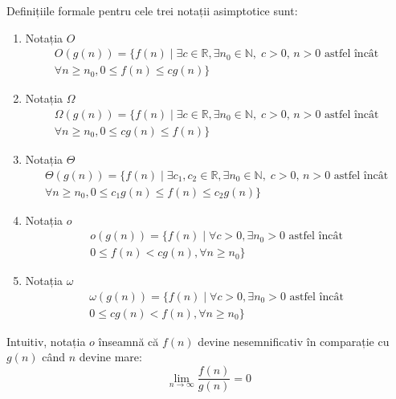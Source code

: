 \documentclass{article}
\begin{document}
Definițiile formale pentru cele trei notații asimptotice sunt:
\begin{enumerate}
	\item Notația $O$
	      \begin{multline}
		      O(g(n)) = \{ f(n) \mid \exists c \in \mathbb{R},
		      \exists n_0 \in \mathbb{N},\; c > 0,\, n > 0 \text{ astfel încât } \\
		      \forall n \geq n_0, 0 \le f(n) \leq c g(n) \}
	      \end{multline}

	\item Notația $\Omega$
	      \begin{multline}
		      \Omega(g(n)) = \{ f(n) \mid \exists c \in \mathbb{R},
		      \exists n_0 \in \mathbb{N},\; c > 0,\, n > 0 \text{ astfel încât } \\
		      \forall n \geq n_0, 0 \le c g(n) \leq f(n) \}
	      \end{multline}

	\item Notația $\Theta$
	      \begin{multline}
		      \Theta(g(n)) = \{ f(n) \mid \exists c_1, c_2 \in \mathbb{R},
		      \exists n_0 \in \mathbb{N},\; c > 0,\, n > 0 \text{ astfel încât } \\
		      \forall n \geq n_0, 0 \le c_1 g(n) \leq f(n) \leq c_2 g(n) \}
	      \end{multline}

	\item Notația $o$
	      \begin{multline}
		      o(g(n)) = \{ f(n) \mid \forall c > 0,
		      \exists n_0 > 0 \text{ astfel încât } \\
		      0 \leq f(n) < c g(n), \forall n \geq n_0 \}
	      \end{multline}

	\item Notația $\omega$
	      \begin{multline}
		      \omega(g(n)) = \{ f(n) \mid \forall c > 0,
		      \exists n_0 > 0 \text{ astfel încât } \\
		      0 \leq c g(n) < f(n), \forall n \geq n_0 \}
	      \end{multline}
\end{enumerate}

Intuitiv, notația $o$ înseamnă că $f(n)$ devine nesemnificativ în comparație cu
$g(n)$ când $n$ devine mare:
\begin{equation*}
	\lim_{n \to \infty} \frac{f(n)}{g(n)} = 0
\end{equation*}
\end{document}

